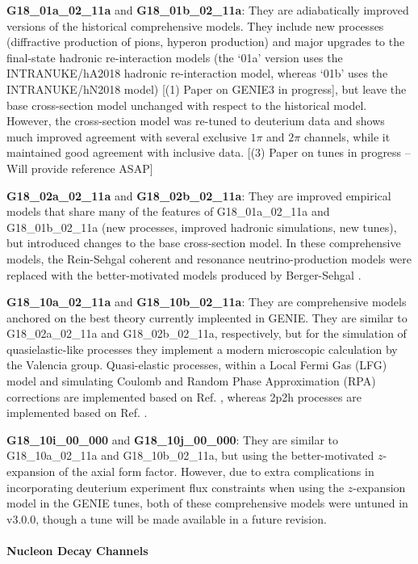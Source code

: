 {\bf G18\_01a\_02\_11a} and {\bf G18\_01b\_02\_11a}: They are adiabatically improved versions of the historical comprehensive models. They include new processes (diffractive production of pions, hyperon production) and major upgrades to the final-state hadronic re-interaction models (the `01a' version uses the INTRANUKE/hA2018 hadronic re-interaction model, whereas `01b' uses the INTRANUKE/hN2018 model) [(1) Paper on GENIE3 in progress], but leave the base cross-section model unchanged with respect to the historical model. However, the cross-section model was re-tuned to deuterium data and shows much improved agreement with several exclusive $1\pi$ and $2\pi$ channels, while it maintained good agreement with inclusive data. [(3) Paper on tunes in progress -- Will provide reference ASAP]

{\bf G18\_02a\_02\_11a} and {\bf G18\_02b\_02\_11a}: They are improved empirical models that share many of the features of G18\_01a\_02\_11a and G18\_01b\_02\_11a (new processes, improved hadronic simulations, new tunes), but introduced changes to the base cross-section model. In these comprehensive models, the Rein-Sehgal coherent and resonance neutrino-production models \cite{Rein:2006di, Rein:1980wg} were replaced with the better-motivated models produced by Berger-Sehgal \cite{Berger:2008xs, Berger:2007rq}.

{\bf G18\_10a\_02\_11a} and {\bf G18\_10b\_02\_11a}: They are comprehensive models anchored on the best theory currently impleented in GENIE. They are similar to G18\_02a\_02\_11a and G18\_02b\_02\_11a, respectively, but for the simulation of quasielastic-like processes they implement a modern microscopic calculation by the Valencia group. Quasi-elastic processes, within a Local Fermi Gas (LFG) model and simulating Coulomb and Random Phase Approximation (RPA) corrections are implemented based on Ref. \cite{Nieves:2004wx}, whereas 2p2h processes are implemented based on Ref. \cite{Nieves:2011pp}.

{\bf G18\_10i\_00\_000} and {\bf G18\_10j\_00\_000}: They are similar to G18\_10a\_02\_11a and G18\_10b\_02\_11a, but using the better-motivated $z$-expansion \cite{Hill:2010yb} of the axial form factor. However, due to extra complications in incorporating deuterium experiment flux constraints when using the $z$-expansion model in the GENIE tunes, both of these comprehensive models were untuned in v3.0.0, though a tune will be made available in a future revision. 

\paragraph{Nucleon Decay Channels}


